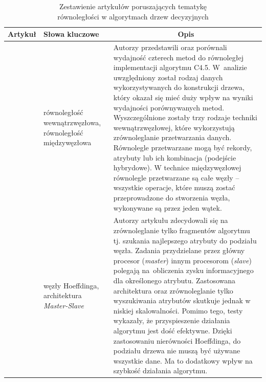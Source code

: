 \documentclass[12pt]{article}
\begin{document}
    \begin{center}

        \begin{longtable}{| c | p{} | p{} |}
            \caption{Zestawienie artykułów poruszających tematykę\\ równoległości w algorytmach drzew decyzyjnych}
            \label{table:articles-parallel-decision-tree}
            \endfirsthead
            \endhead

            \hline
            
            \textbf{Artykuł} &\textbf{Słowa kluczowe} & \multicolumn{1}{|c|}{\textbf{Opis}}
            
            \\ \hline \hline 

            \cite{parallelization-of-decision-tree-al} &

            równoległość wewnątrzwęzłowa, równoległość międzywęzłowa &

            Autorzy przedstawili oraz porównali wydajność czterech metod do równoległej implementacji algorytmu C4.5.
            W~analizie uwzględniony został rodzaj danych wykorzystywanych do konstrukcji drzewa, który okazał
            się mieć duży wpływ na wyniki wydajności porównywanych metod. Wyszczególnione zostały trzy rodzaje
            techniki wewnątrzwęzłowej, które wykorzystują zrównoleglanie przetwarzania danych. Równolegle
            przetwarzane mogą być rekordy, atrybuty lub ich kombinacja (podejście hybrydowe). W technice międzywęzłowej
            równolegle przetwarzane są całe węzły -- wszystkie operacje, które muszą zostać przeprowadzone do stworzenia
            węzła, wykonywane są przez jeden wątek. \\
            
            \hline

            \cite{parallel-hoeffding-decision-tree} &

            węzły Hoeffdinga, architektura \textit{Master-Slave} &

            Autorzy artykułu zdecydowali się na zrównoleglanie tylko fragmentów algorytmu tj. szukania
            najlepszego atrybuty do podziału węzła. Zadania przydzielane przez główny procesor
            (\textit{master}) innym procesorom (\textit{slave}) polegają na~obliczenia zysku informacyjnego dla określonego
            atrybutu. Zastosowana architektura oraz zrównoleglanie tylko wyszukiwania atrybutów skutkuje
            jednak w niskiej skalowalności. Pomimo tego, testy wykazały, że przyspieszenie działania algorytmu
            jest dość efektywne. Dzięki zastosowaniu nierówności Hoeffdinga, do podziału drzewa nie muszą być
            używane wszystkie dane. Ma to dodatkowy wpływ na szybkość działania algorytmu. \\
            

\end{longtable}
\end{center}
\end{document}
